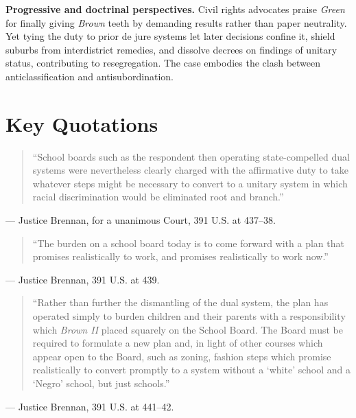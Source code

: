 \documentclass[12pt]{article}
\begin{document}
\textbf{Progressive and doctrinal perspectives.} Civil rights advocates praise \textit{Green} for finally giving \textit{Brown} teeth by demanding results rather than paper neutrality. Yet tying the duty to prior de jure systems let later decisions confine it, shield suburbs from interdistrict remedies, and dissolve decrees on findings of unitary status, contributing to resegregation. The case embodies the clash between anticlassification and antisubordination.

\section{Key Quotations}

\begin{quote}
``School boards such as the respondent then operating state-compelled dual systems were nevertheless clearly charged with the affirmative duty to take whatever steps might be necessary to convert to a unitary system in which racial discrimination would be eliminated root and branch.''
\end{quote}
\noindent --- Justice Brennan, for a unanimous Court, 391 U.S. at 437--38.

\begin{quote}
``The burden on a school board today is to come forward with a plan that promises realistically to work, and promises realistically to work now.''
\end{quote}
\noindent --- Justice Brennan, 391 U.S. at 439.

\begin{quote}
``Rather than further the dismantling of the dual system, the plan has operated simply to burden children and their parents with a responsibility which \textit{Brown II} placed squarely on the School Board. The Board must be required to formulate a new plan and, in light of other courses which appear open to the Board, such as zoning, fashion steps which promise realistically to convert promptly to a system without a `white' school and a `Negro' school, but just schools.''
\end{quote}
\noindent --- Justice Brennan, 391 U.S. at 441--42.
\end{document}
